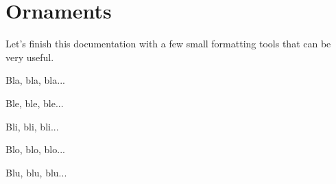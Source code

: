 \documentclass[10pt, a4paper]{article}
\begin{document}
\section{Ornaments}

Let's finish this documentation with a few small formatting tools that can be very useful.

\begin{tdoclatex}[sbs]
Bla, bla, bla...

\tdocsep %

Ble, ble, ble...

Bli, bli, bli...

\tdocxspace %

Blo, blo, blo...

Blu, blu, blu...

\end{tdoclatex}
\end{document}
